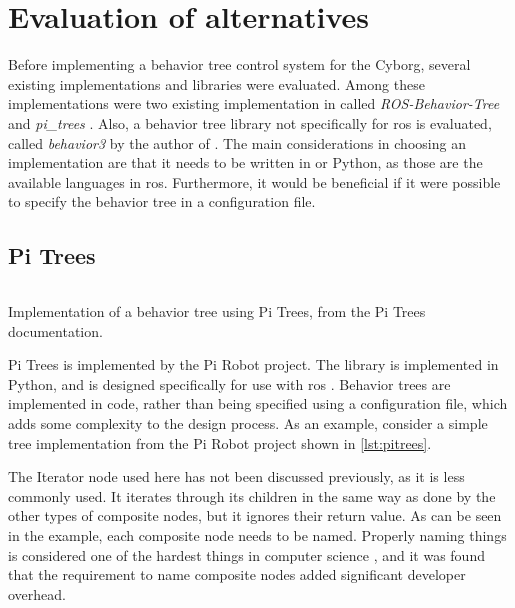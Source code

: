 \documentclass[\rootfolder/main.tex]{subfiles}
\begin{document}
\section{Evaluation of alternatives}

Before implementing a behavior tree control system for the Cyborg, several existing implementations and libraries were evaluated.
Among these implementations were two existing implementation in  called \emph{ROS-Behavior-Tree} \cite{Colledanchise} and \emph{pi\_trees} \cite{Goebel}.
Also, a behavior tree library not specifically for \acrshort{ros} is evaluated, called \emph{behavior3} by the author of \cite{Pereira2015}.
The main considerations in choosing an implementation are that it needs to be written in \CC or Python, as those are the available languages in \acrshort{ros}.
Furthermore, it would be beneficial if it were possible to specify the behavior tree in a configuration file.

\subsection{Pi Trees}

\begin{listing}
    \inputminted[fontsize=\scriptsize]{Python}{\rootfolder/Chapters/Chapter3/Listings/pitrees.py}
    \caption[Implementation of a behavior tree using Pi Trees.]{Implementation of a behavior tree using Pi Trees, from the Pi Trees documentation.}
    \label{lst:pitrees}
\end{listing}

Pi Trees is implemented by the Pi Robot project.
The library is implemented in Python, and is designed specifically for use with \acrshort{ros} \cite{Goebel}.
Behavior trees are implemented in code, rather than being specified using a configuration file, which adds some complexity to the design process.
As an example, consider a simple tree implementation from the Pi Robot project \cite{PiRobot} shown in \cref{lst:pitrees}.

The Iterator node used here has not been discussed previously, as it is less commonly used.
It iterates through its children in the same way as done by the other types of composite nodes, but it ignores their return value.
As can be seen in the example, each composite node needs to be named.
Properly naming things is considered one of the hardest things in computer science \cite{Fowler}, and it was found that the requirement to name composite nodes added significant developer overhead.
\end{document}
